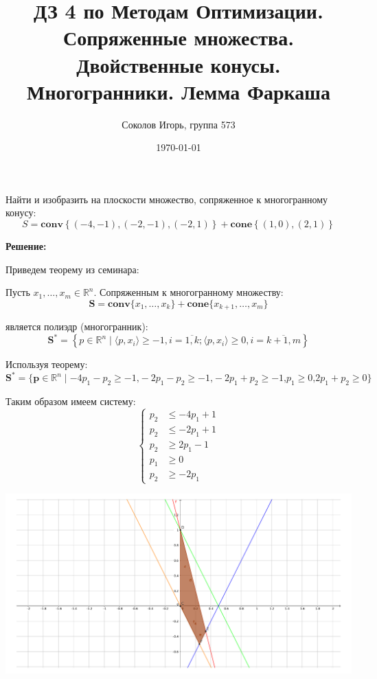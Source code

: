 \documentclass[a4paper,12pt]{article}
\author{Соколов Игорь, группа 573}
\title{ДЗ 4 по Методам Оптимизации. \newline Сопряженные множества. Двойственные конусы. Многогранники. Лемма Фаркаша}
\date{\today}
\begin{document}
	\maketitle
	
	\section{}
	
	Найти и изобразить на плоскости множество, сопряженное к многогранному конусу: $$ S = \mathbf{conv} \left\{ (-4,-1), (-2,-1), (-2,1)\right\} + \mathbf{cone} \left\{ (1,0), (2,1)\right\} $$
	
	\vspace{\baselineskip}
	
	\textbf{Решение:}
	
	Приведем теорему из семинара:
	
	Пусть $x_1,\ldots,x_m \in\mathbb{R}^n$. Сопряженным к многогранному множеству:
	$$ \textbf{S} = \mathbf{conv}\{x_1, \ldots, x_k\} + \mathbf{cone}\{x_{k+1}, \ldots, x_m \}$$
	
	является полиэдр (многогранник):
	\[\mathbf{S}^* = \left\{p \in \mathbb{R}^n \mid \langle{ p, x_i }\rangle \ge -1, i = \overline{1, k}; \langle{ p, x_i }\rangle \ge 0 , i =\overline{k+1, m} \right\} \]
	
	Используя теорему:
	\[\mathbf{S}^* = \{\mathbf{p} \in \mathbb{R}^n \mid -4p_1 - p_2 \ge -1\textbf{,} - 2p_1 -p_2 \ge -1\textbf{,} -2p_1 + p_2 \ge -1 \textbf{,} p_1 \ge 0 \textbf{,} 2p_1 + p_2 \ge 0\}\]
	
	Таким образом имеем систему:
	\[
	\left\{
	\begin{aligned}
	p_2 &\leq -4p_1 + 1  \\
	p_2 &\leq -2p_1 + 1\\
	p_2 &\ge 2p_1 - 1\\
	p_1 &\ge 0  \\
	p_2 &\ge -2p_1
	\end{aligned}
	\right.
	\]
	
	\includegraphics[width=\textwidth]{image_problem1.pdf}
	
\end{document}
